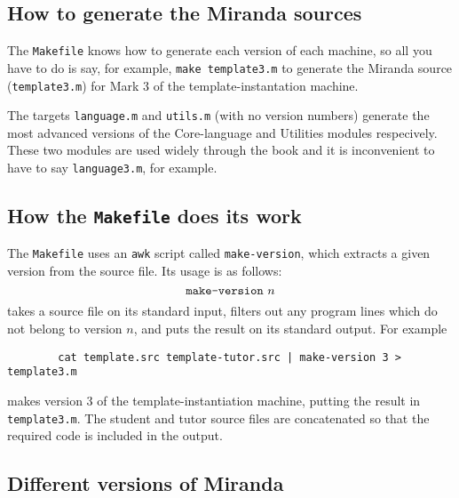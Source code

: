 \subsection{How to generate the Miranda sources}

The \mbox{\tt Makefile} knows how to generate each version of each machine, so
all you have to do is say, for example, 
\mbox{\tt make\ template3.m} to generate the Miranda
source (\mbox{\tt template3.m}) for Mark 3 of the template-instantation machine.

The targets \mbox{\tt language.m} and \mbox{\tt utils.m} (with no version numbers) generate
the most advanced versions of the Core-language and Utilities 
modules respecively.
These two modules are used widely through the book and it is inconvenient
to have to say \mbox{\tt language3.m}, for example.

\subsection{How the \mbox{\tt Makefile} does its work}

The \mbox{\tt Makefile} uses an \mbox{\tt awk} script called \mbox{\tt make-version}, 
which extracts a given version from the source file.  Its usage is as follows:
$$
\mbox{\tt make-version}~n
$$
takes a source file on its standard input, filters out any program lines
which do not belong to version $n$, and puts the result on its standard output.
For example
\begin{verbatim}
        cat template.src template-tutor.src | make-version 3 > template3.m
\end{verbatim}
makes version 3 of the template-instantiation machine, putting the result
in \mbox{\tt template3.m}.  The student and tutor source files are concatenated
so that the required code is included in the output.

\subsection{Different versions of Miranda}

